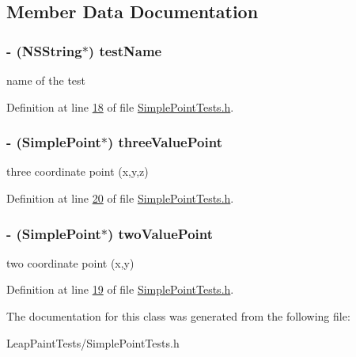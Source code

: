 \subsection{Member Data Documentation}
\hypertarget{interface_simple_point_tests_a649cb8fc74d522648b3d242a79d67c52}{
\subsubsection[{test\-Name}]{\setlength{\rightskip}{0pt plus 5cm}-\/ (N\-S\-String$\ast$) test\-Name\hspace{0.3cm}{\ttfamily [protected]}}}\label{df/dbc/interface_simple_point_tests_a649cb8fc74d522648b3d242a79d67c52}
name of the test 

Definition at line \hyperlink{_simple_point_tests_8h_source_l00018}{18} of file \hyperlink{_simple_point_tests_8h_source}{Simple\-Point\-Tests.\-h}.

\hypertarget{interface_simple_point_tests_a3eaccf68ce0b22a31daba1edb2e70762}{
\subsubsection[{three\-Value\-Point}]{\setlength{\rightskip}{0pt plus 5cm}-\/ ({\bf Simple\-Point}$\ast$) three\-Value\-Point\hspace{0.3cm}{\ttfamily [protected]}}}\label{df/dbc/interface_simple_point_tests_a3eaccf68ce0b22a31daba1edb2e70762}
three coordinate point (x,y,z) 

Definition at line \hyperlink{_simple_point_tests_8h_source_l00020}{20} of file \hyperlink{_simple_point_tests_8h_source}{Simple\-Point\-Tests.\-h}.

\hypertarget{interface_simple_point_tests_a7de54d867fc86e46d98627fd689508f6}{
\subsubsection[{two\-Value\-Point}]{\setlength{\rightskip}{0pt plus 5cm}-\/ ({\bf Simple\-Point}$\ast$) two\-Value\-Point\hspace{0.3cm}{\ttfamily [protected]}}}\label{df/dbc/interface_simple_point_tests_a7de54d867fc86e46d98627fd689508f6}
two coordinate point (x,y) 

Definition at line \hyperlink{_simple_point_tests_8h_source_l00019}{19} of file \hyperlink{_simple_point_tests_8h_source}{Simple\-Point\-Tests.\-h}.



The documentation for this class was generated from the following file\-:\begin{DoxyCompactItemize}
\item 
Leap\-Paint\-Tests/Simple\-Point\-Tests.\-h\end{DoxyCompactItemize}
